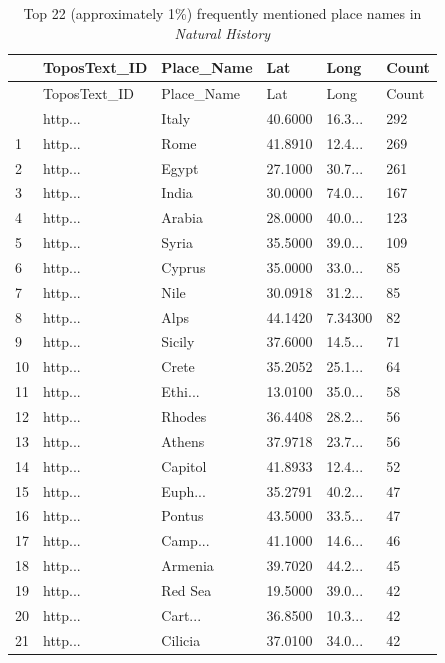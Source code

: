 \documentclass[
  12pt,
]{article}
\begin{document}
\hypertarget{tbl-topplace}{}
\begin{longtable}[]{@{}llllll@{}}
\caption{\label{tbl-topplace}Top 22 (approximately 1\%) frequently
mentioned place names in \emph{Natural History}}\tabularnewline
\toprule\noalign{}
& ToposText\_ID & Place\_Name & Lat & Long & Count \\
\midrule\noalign{}
\endfirsthead
\toprule\noalign{}
& ToposText\_ID & Place\_Name & Lat & Long & Count \\
\midrule\noalign{}
\endhead
\bottomrule\noalign{}
\endlastfoot
0 & http... & Italy & 40.6000 & 16.3... & 292 \\
1 & http... & Rome & 41.8910 & 12.4... & 269 \\
2 & http... & Egypt & 27.1000 & 30.7... & 261 \\
3 & http... & India & 30.0000 & 74.0... & 167 \\
4 & http... & Arabia & 28.0000 & 40.0... & 123 \\
5 & http... & Syria & 35.5000 & 39.0... & 109 \\
6 & http... & Cyprus & 35.0000 & 33.0... & 85 \\
7 & http... & Nile & 30.0918 & 31.2... & 85 \\
8 & http... & Alps & 44.1420 & 7.34300 & 82 \\
9 & http... & Sicily & 37.6000 & 14.5... & 71 \\
10 & http... & Crete & 35.2052 & 25.1... & 64 \\
11 & http... & Ethi... & 13.0100 & 35.0... & 58 \\
12 & http... & Rhodes & 36.4408 & 28.2... & 56 \\
13 & http... & Athens & 37.9718 & 23.7... & 56 \\
14 & http... & Capitol & 41.8933 & 12.4... & 52 \\
15 & http... & Euph... & 35.2791 & 40.2... & 47 \\
16 & http... & Pontus & 43.5000 & 33.5... & 47 \\
17 & http... & Camp... & 41.1000 & 14.6... & 46 \\
18 & http... & Armenia & 39.7020 & 44.2... & 45 \\
19 & http... & Red Sea & 19.5000 & 39.0... & 42 \\
20 & http... & Cart... & 36.8500 & 10.3... & 42 \\
21 & http... & Cilicia & 37.0100 & 34.0... & 42 \\
\end{longtable}
\end{document}
